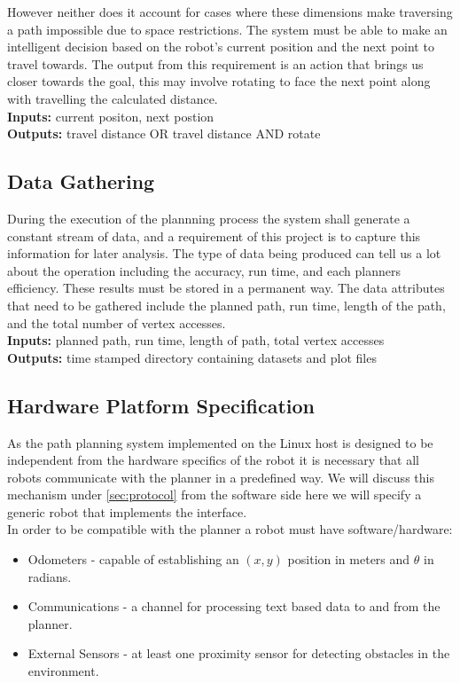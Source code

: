 \noindent
However neither does it account for cases where these dimensions make traversing a path impossible due to space restrictions. The system must be able to make an intelligent decision based on the robot's current position and the next point to travel towards. The output from this requirement is an action that brings us closer towards the goal, this may involve rotating to face the next point along with travelling the calculated distance. \\

\noindent
\textbf{Inputs:} current positon, next postion \\
\textbf{Outputs:} travel distance OR travel distance AND rotate

\subsection{Data Gathering}
\noindent
During the execution of the plannning process the system shall generate a constant stream of data, and a requirement
of this project is to capture this information for later analysis. The type of data being produced can tell us a lot
about the operation including the accuracy, run time, and each planners efficiency. These results must be stored in a permanent way. The data attributes that need to be gathered include the planned path, run time, length of the path, and the total number of vertex accesses. \\

\noindent
\textbf{Inputs:} planned path, run time, length of path, total vertex accesses \\
\textbf{Outputs:} time stamped directory containing datasets and plot files

\subsection{Hardware Platform Specification}\label{hardware_specification}
\noindent
As the path planning system implemented on the Linux host is designed to be independent from the hardware specifics of the robot it is necessary that all robots communicate with the planner in a predefined way. We will discuss this mechanism under \ref{sec:protocol} from the software side here we will specify a generic robot that implements the interface. \\

\noindent
In order to be compatible with the planner a robot must have software/hardware:

\begin{itemize}
\item Odometers - capable of establishing an $(x, y)$ position in meters and $\theta$ in radians.
\item Communications - a channel for processing text based data to and from the planner.
\item External Sensors - at least one proximity sensor for detecting obstacles in the environment.
\end{itemize}

